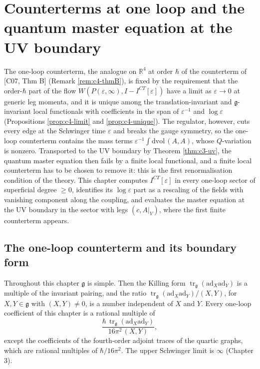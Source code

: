 \chapter{Counterterms at one loop and the quantum master equation at the UV boundary}

The one-loop counterterm, the analogue on $\mathbb R^4$ at order $\hbar$ of the counterterm of [C07, Thm B] (Remark \ref{rem:c4-thmB}), is fixed by the requirement that the order-$\hbar$ part of the flow $W(P(\varepsilon,\infty),I-I^{CT}[\varepsilon])$ have a limit as $\varepsilon\to0$ at generic leg momenta, and it is unique among the translation-invariant and $\mathfrak g$-invariant local functionals with coefficients in the span of $\varepsilon^{-1}$ and $\log\varepsilon$ (Propositions \ref{prop:c4-limit} and \ref{prop:c4-unique}). The regulator, however, cuts every edge at the Schwinger time $\varepsilon$ and breaks the gauge symmetry, so the one-loop counterterm contains the mass terms $\varepsilon^{-1}\int\mathrm{dvol}\,(A,A)$, whose $Q$-variation is nonzero. Transported to the UV boundary by Theorem \ref{thm:c3-uv}, the quantum master equation then fails by a finite local functional, and a finite local counterterm has to be chosen to remove it: this is the first renormalisation condition of the theory. This chapter computes $I^{CT}[\varepsilon]$ in every one-loop sector of superficial degree $\ge0$, identifies its $\log\varepsilon$ part as a rescaling of the fields with vanishing component along the coupling, and evaluates the master equation at the UV boundary in the sector with legs $(c,A|_V)$, where the first finite counterterm appears.

\section{The one-loop counterterm and its boundary form}

Throughout this chapter $\mathfrak g$ is simple. Then the Killing form $\operatorname{tr}_{\mathfrak g}(\mathrm{ad}_X\mathrm{ad}_Y)$ is a multiple of the invariant pairing, and the ratio $\operatorname{tr}_{\mathfrak g}(\mathrm{ad}_X\mathrm{ad}_Y)/(X,Y)$, for $X,Y\in\mathfrak g$ with $(X,Y)\neq0$, is a number independent of $X$ and $Y$. Every one-loop coefficient of this chapter is a rational multiple of
\[
\frac{\hbar\,\operatorname{tr}_{\mathfrak g}(\mathrm{ad}_X\mathrm{ad}_Y)}{16\pi^2\,(X,Y)},
\]
except the coefficients of the fourth-order adjoint traces of the quartic graphs, which are rational multiples of $\hbar/16\pi^2$. The upper Schwinger limit is $\infty$ (Chapter 3).

